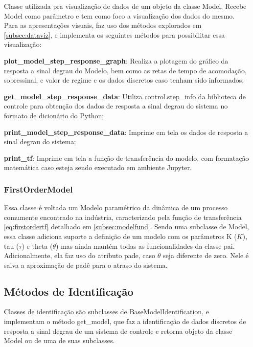 Classe utilizada pra visualização de dados de um objeto da classe Model.
Recebe Model como parâmetro e tem como foco a visualização dos dados do mesmo.
Para as apresentações visuais, faz uso dos métodos explorados em \ref{subsec:dataviz}, e implementa os seguintes
métodos para possibilitar essa visualização:
\begin{alineas}
    \item \textbf{plot\_model\_step\_response\_graph}: Realiza a plotagem do gráfico da resposta a sinal degrau do
    Modelo, bem como as retas de tempo de acomodação, sobressinal, e valor de regime e os dados discretos caso tenham
    sido informados;
    \item \textbf{get\_model\_step\_response\_data}: Utiliza control.step\_info da biblioteca de controle para
    obtenção dos dados de resposta a sinal degrau do sistema no formato de dicionário do Python;
    \item \textbf{print\_model\_step\_response\_data}: Imprime em tela os dados de resposta a sinal degrau do sistema;
    \item \textbf{print\_tf}: Imprime em tela a função de transferência do modelo, com formatação matemática caso
    esteja sendo executado em ambiente Jupyter.
\end{alineas}

\subsubsection{FirstOrderModel}\label{subsubsec:fom}

Essa classe é voltada um Modelo paramétrico da dinâmica de um processo comumente encontrado na indústria,
caracterizado pela função de transferência \eqref{eq:firstordertf} detalhado em \ref{subsec:modelfund}. Sendo uma
subclasse de Model, essa classe adiciona suporte a definição de um modelo com os parâmetros K ($K$), tau
($\tau$) e theta ($\theta$) mas ainda mantém todas as funcionalidades da classe pai. Adicionalmente, ela faz uso do
atributo pade, caso $\theta$ seja diferente de zero.
Nele é salva a aproximação de padê para o atraso do sistema.

\subsection{Métodos de Identificação}

Classes de identificação são subclasses de BaseModelIdentification, e implementam o método get\_model, que faz a
identificação de dados discretos de resposta a sinal degrau de um sistema de controle e retorna objeto da classe Model
ou de uma de suas subclasses.

